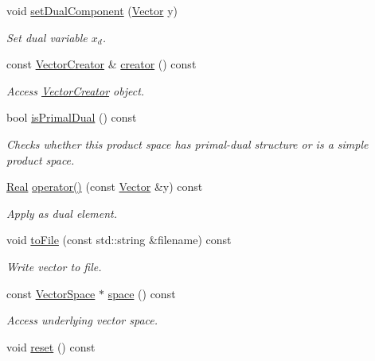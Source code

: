 \begin{DoxyCompactItemize}
void \hyperlink{classSpacy_1_1ProductSpace_1_1Vector_abed4ceed81286d09d3335b5255e90ffc_abed4ceed81286d09d3335b5255e90ffc}{set\+Dual\+Component} (\hyperlink{classSpacy_1_1ProductSpace_1_1Vector}{Vector} y)
\begin{DoxyCompactList}\small\item\em Set dual variable $x_d$. \end{DoxyCompactList}\item 
const \hyperlink{classSpacy_1_1ProductSpace_1_1VectorCreator}{Vector\+Creator} \& \hyperlink{classSpacy_1_1ProductSpace_1_1Vector_a893de5e5a2bb37d2d512c035b0ad91ea_a893de5e5a2bb37d2d512c035b0ad91ea}{creator} () const 
\begin{DoxyCompactList}\small\item\em Access \hyperlink{classSpacy_1_1ProductSpace_1_1VectorCreator}{Vector\+Creator} object. \end{DoxyCompactList}\item 
bool \hyperlink{classSpacy_1_1ProductSpace_1_1Vector_af20879b1f579dfd46f7dea9fd03047ac_af20879b1f579dfd46f7dea9fd03047ac}{is\+Primal\+Dual} () const 
\begin{DoxyCompactList}\small\item\em Checks whether this product space has primal-\/dual structure or is a simple product space. \end{DoxyCompactList}\item 
\hyperlink{classSpacy_1_1Real}{Real} \hyperlink{classSpacy_1_1ProductSpace_1_1Vector_a76456c8d29f06dd24bf67e941edaba9d_a76456c8d29f06dd24bf67e941edaba9d}{operator()} (const \hyperlink{classSpacy_1_1ProductSpace_1_1Vector}{Vector} \&y) const 
\begin{DoxyCompactList}\small\item\em Apply as dual element. \end{DoxyCompactList}\item 
void \hyperlink{classSpacy_1_1ProductSpace_1_1Vector_a03a42eec9806a3d31cd9b74551f7686d_a03a42eec9806a3d31cd9b74551f7686d}{to\+File} (const std\+::string \&filename) const 
\begin{DoxyCompactList}\small\item\em Write vector to file. \end{DoxyCompactList}\item 
const \hyperlink{classSpacy_1_1VectorSpace}{Vector\+Space} $\ast$ \hyperlink{classSpacy_1_1VectorBase_a95e87ce98f5a7646055d4e87e6024044_a95e87ce98f5a7646055d4e87e6024044}{space} () const 
\begin{DoxyCompactList}\small\item\em Access underlying vector space. \end{DoxyCompactList}\item 
\hypertarget{classSpacy_1_1Mixin_1_1PrimalDualSwitch_a046abcbcce6510a13fd2191ee9bfdf2f}{}void \hyperlink{classSpacy_1_1Mixin_1_1PrimalDualSwitch_a046abcbcce6510a13fd2191ee9bfdf2f}{reset} () const \label{classSpacy_1_1Mixin_1_1PrimalDualSwitch_a046abcbcce6510a13fd2191ee9bfdf2f}


\end{DoxyCompactItemize}

